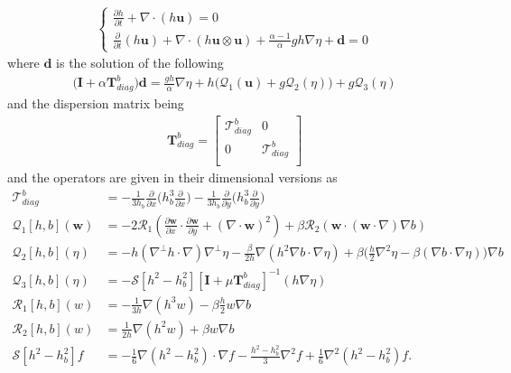 \begin{align}
    \begin{cases}
        \frac{\partial h}{\partial t} + \nabla \cdot (h \textbf{u}) = 0 \\
        \frac{\partial}{\partial t} (h \textbf{u}) + \nabla \cdot (h \textbf{u} \otimes \textbf{u}) + \frac{\alpha - 1}{\alpha} g h \nabla \eta + \textbf{d} = 0
    \end{cases}
    \label{dcdsgn}
\end{align}
where $\textbf{d}$ is the solution of the following
\begin{align}
    \big( \textbf{I} + \alpha \textbf{T}_{diag}^b \big) \textbf{d} = \frac{gh}{\alpha} \nabla \eta + h\big( \mathcal{Q}_1(\textbf{u}) + g \mathcal{Q}_2(\eta) \big) + g \mathcal{Q}_3 (\eta)
    \label{eq4d}
\end{align}
and the dispersion matrix being
\begin{align}
    \textbf{T}_{diag}^b =
    \begin{bmatrix}
        \mathcal{T}_{diag}^b & 0 \\
        0 & \mathcal{T}_{diag}^b \\
    \end{bmatrix}
\end{align}
and the operators are given in their dimensional versions as
\begin{align}
    \mathcal{T}_{diag}^b &= -\frac{1}{3 h_b} \frac{\partial}{\partial x}\big( h_b^3 \frac{\partial}{\partial x} \big) - \frac{1}{3 h_b} \frac{\partial}{\partial y}\big( h_b^3 \frac{\partial}{\partial y} \big) \\
    \mathcal{Q}_1 [h,b] (\textbf{w}) &= -2 \mathcal{R}_1(\frac{\partial \textbf{w}}{\partial x} \cdot \frac{\partial \textbf{w}}{\partial y} + (\nabla \cdot \textbf{w})^2) + \beta \mathcal{R}_2(\textbf{w} \cdot (\textbf{w} \cdot \nabla) \nabla b) \\
    \mathcal{Q}_2 [h,b] (\eta) &= -h (\nabla^{\bot} h \cdot \nabla) \nabla^{\bot} \eta - \frac{\beta}{2h} \nabla(h^2 \nabla b \cdot \nabla \eta) + \beta \big(\frac{h}{2} \nabla^2 \eta - \beta (\nabla b \cdot \nabla \eta) \big) \nabla b \\
    \mathcal{Q}_3 [h,b] (\eta) &= -\mathcal{S}[h^2 - h^2_b] [\textbf{I} + \mu \textbf{T}_{diag}^b]^{-1} (h \nabla \eta) \\
    \mathcal{R}_1 [h,b] (w) &= -\frac{1}{3h} \nabla(h^3w) - \beta \frac{h}{2} w \nabla b \\
    \mathcal{R}_2 [h,b] (w) &= \frac{1}{2h} \nabla(h^2 w) + \beta w \nabla b \\
    \mathcal{S}[h^2 - h^2_b] f &= -\frac{1}{6} \nabla(h^2 - h^2_b) \cdot \nabla f - \frac{h^2 - h^2_b}{3} \nabla^2 f + \frac{1}{6} \nabla^2 (h^2 - h^2_b) f.
\end{align}
